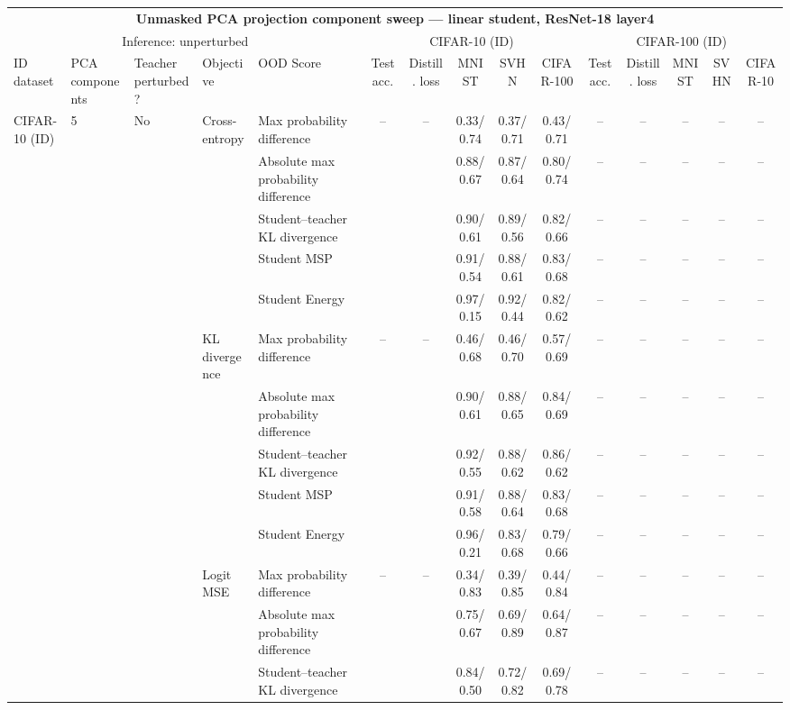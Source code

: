 \documentclass[border=2pt]{standalone}
\begin{document}
\scriptsize
\setlength{\tabcolsep}{3pt}
\begin{tabular}{lllllcccccccccc}
\multicolumn{15}{c}{\textbf{Unmasked PCA projection component sweep --- linear student, ResNet-18 layer4}}\\[4pt]
\multicolumn{5}{c}{Inference: unperturbed} & \multicolumn{5}{c}{CIFAR-10 (ID)} & \multicolumn{5}{c}{CIFAR-100 (ID)} \\
\cmidrule(lr){6-10} \cmidrule(lr){11-15}
\toprule
ID dataset & PCA components & Teacher perturbed? & Objective & OOD Score & Test acc. & Distill. loss & MNIST & SVHN & CIFAR-100 & Test acc. & Distill. loss & MNIST & SVHN & CIFAR-10 \\
\midrule
CIFAR-10 (ID) & 5 & No & Cross-entropy & Max probability difference & -- & -- & 0.33/0.74 & 0.37/0.71 & 0.43/0.71 & -- & -- & -- & -- & -- \\
 &  &  &  & Absolute max probability difference &  &  & 0.88/0.67 & 0.87/0.64 & 0.80/0.74 & -- & -- & -- & -- & -- \\
 &  &  &  & Student--teacher KL divergence &  &  & 0.90/0.61 & 0.89/0.56 & 0.82/0.66 & -- & -- & -- & -- & -- \\
 &  &  &  & Student MSP &  &  & 0.91/0.54 & 0.88/0.61 & 0.83/0.68 & -- & -- & -- & -- & -- \\
 &  &  &  & Student Energy &  &  & 0.97/0.15 & 0.92/0.44 & 0.82/0.62 & -- & -- & -- & -- & -- \\
 &  &  & KL divergence & Max probability difference & -- & -- & 0.46/0.68 & 0.46/0.70 & 0.57/0.69 & -- & -- & -- & -- & -- \\
 &  &  &  & Absolute max probability difference &  &  & 0.90/0.61 & 0.88/0.65 & 0.84/0.69 & -- & -- & -- & -- & -- \\
 &  &  &  & Student--teacher KL divergence &  &  & 0.92/0.55 & 0.88/0.62 & 0.86/0.62 & -- & -- & -- & -- & -- \\
 &  &  &  & Student MSP &  &  & 0.91/0.58 & 0.88/0.64 & 0.83/0.68 & -- & -- & -- & -- & -- \\
 &  &  &  & Student Energy &  &  & 0.96/0.21 & 0.83/0.68 & 0.79/0.66 & -- & -- & -- & -- & -- \\
 &  &  & Logit MSE & Max probability difference & -- & -- & 0.34/0.83 & 0.39/0.85 & 0.44/0.84 & -- & -- & -- & -- & -- \\
 &  &  &  & Absolute max probability difference &  &  & 0.75/0.67 & 0.69/0.89 & 0.64/0.87 & -- & -- & -- & -- & -- \\
 &  &  &  & Student--teacher KL divergence &  &  & 0.84/0.50 & 0.72/0.82 & 0.69/0.78 & -- & -- & -- & -- & -- \\

\end{tabular}
\end{document}
